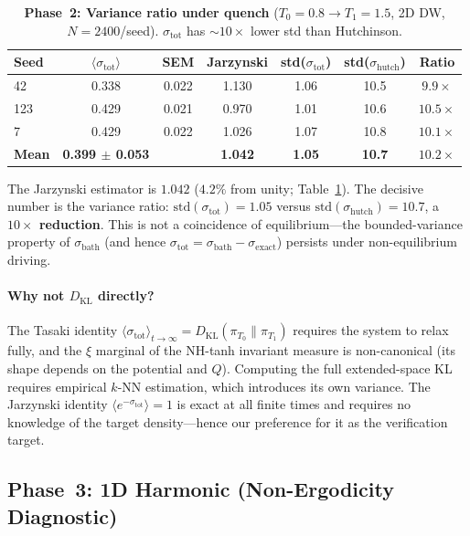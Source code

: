 \documentclass[11pt]{article}
\newcommand{\sbath}{\sigma_{\mathrm{bath}}}
\newcommand{\shutch}{\sigma_{\mathrm{hutch}}}
\newcommand{\sexact}{\sigma_{\mathrm{exact}}}
\newcommand{\stot}{\sigma_{\mathrm{tot}}}
\begin{document}
\begin{table}[t]
  \centering
  \caption{\textbf{Phase~2: Variance ratio under quench}
    ($T_0{=}0.8 \to T_1{=}1.5$, 2D DW, $N{=}2400$/seed).
    $\stot$ has ${\sim}10\times$ lower std than Hutchinson.}
  \label{tab:phase2}
  \small
  \begin{tabular}{lcccccc}
    \toprule
    Seed & $\langle \stot \rangle$ & SEM
      & Jarzynski & std($\stot$) & std($\shutch$) & Ratio \\
    \midrule
    42  & 0.338 & 0.022 & 1.130 & 1.06 & 10.5 & $9.9\times$ \\
    123 & 0.429 & 0.021 & 0.970 & 1.01 & 10.6 & $10.5\times$ \\
    7   & 0.429 & 0.022 & 1.026 & 1.07 & 10.8 & $10.1\times$ \\
    \midrule
    \textbf{Mean} & \textbf{0.399 $\pm$ 0.053}
      & & \textbf{1.042} & \textbf{1.05} & \textbf{10.7}
      & $\mathbf{10.2\times}$ \\
    \bottomrule
  \end{tabular}
\end{table}

The Jarzynski estimator is $1.042$ ($4.2\%$ from unity; Table~\ref{tab:phase2}).
The decisive number is the variance ratio: $\text{std}(\stot) = 1.05$ versus
$\text{std}(\shutch) = 10.7$, a \textbf{$10\times$ reduction}. This is not a
coincidence of equilibrium---the bounded-variance property of $\sbath$
(and hence $\stot = \sbath - \sexact$) persists under non-equilibrium driving.

\paragraph{Why not $D_{\mathrm{KL}}$ directly?}
The Tasaki identity
$\langle \stot \rangle_{t \to \infty} = D_{\mathrm{KL}}(\pi_{T_0} \| \pi_{T_1})$
requires the system to relax fully, and the $\xi$ marginal of the NH-tanh
invariant measure is non-canonical (its shape depends on the potential and $Q$).
Computing the full extended-space KL requires empirical $k$-NN estimation,
which introduces its own variance. The Jarzynski identity
$\langle e^{-\stot} \rangle = 1$ is exact at all finite times and requires no
knowledge of the target density---hence our preference for it as the
verification target.

\subsection{Phase~3: 1D Harmonic (Non-Ergodicity Diagnostic)}
\label{sec:harmonic}
\end{document}
